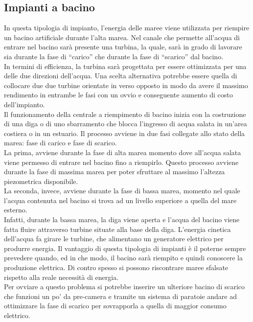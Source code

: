 \subsection{Impianti a bacino}
In questa tipologia di impianto, l'energia delle maree viene utilizzata per riempire un bacino artificiale durante l'alta marea. Nel canale che permette all'acqua di entrare nel bacino sarà presente una turbina, la quale, sarà in grado di lavorare sia durante la fase di \enquote{carico} che durante la fase di \enquote{scarico} dal bacino.\\
In termini di efficienza, la turbina sarà progettata per essere ottimizzata per una delle due direzioni dell'acqua. Una scelta alternativa potrebbe essere quella di collocare due due turbine orientate in verso opposto in modo da avere il massimo rendimento in entrambe le fasi con un ovvio e conseguente aumento di costo dell'impianto.\\
Il funzionamento della centrale a riempimento di bacino inizia con la costruzione di una diga o di uno sbarramento che blocca l'ingresso di acqua salata in un'area costiera o in un estuario.
Il processo avviene in due fasi collegate allo stato della marea: fase di carico e fase di scarico.\\
La prima, avviene durante la fase di alta marea momento dove all'acqua salata viene permesso di entrare nel bacino fino a riempirlo. Questo processo avviene durante la fase di massima marea per poter sfruttare al massimo l'altezza piezometrica disponibile.\\
La seconda, invece, avviene durante la fase di bassa marea, momento nel quale l'acqua contenuta nel bacino si trova ad un livello superiore a quella del mare esterno.\\
Infatti, durante la bassa marea, la diga viene aperta e l'acqua del bacino viene fatta fluire attraverso turbine situate alla base della diga.
L'energia cinetica dell'acqua fa girare le turbine, che alimentano un generatore elettrico per produrre energia.
Il vantaggio di questa tipologia di impianti è il poterne sempre prevedere quando, ed in che modo, il bacino sarà riempito e quindi conoscere la produzione elettrica. Di contro spesso si possono riscontrare maree sfalsate rispetto alla reale necessità di energia.\\
Per ovviare a questo problema si potrebbe inserire un ulteriore bacino di scarico che funzioni un po' da pre-camera e tramite un sistema di paratoie andare ad ottimizzare la fase di scarico per sovrapporla a quella di maggior consumo elettrico.\\
